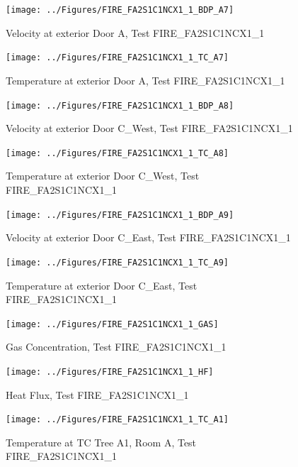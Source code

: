 \documentclass[11pt,oneside]{book}
\begin{document}
\begin{figure}[!ht]
\texttt{[image: ../Figures/FIRE\_FA2S1C1NCX1\_1\_BDP\_A7]}
\caption{Velocity at exterior Door A, Test FIRE\_FA2S1C1NCX1\_1}
\label{fig:FIRE_FA2S1C1NCX1_1_BDP_A7}
\end{figure}

\begin{figure}[!ht]
\texttt{[image: ../Figures/FIRE\_FA2S1C1NCX1\_1\_TC\_A7]}
\caption{Temperature at exterior Door A, Test FIRE\_FA2S1C1NCX1\_1}
\label{fig:FIRE_FA2S1C1NCX1_1_TC_A7}
\end{figure}

\begin{figure}[!ht]
\texttt{[image: ../Figures/FIRE\_FA2S1C1NCX1\_1\_BDP\_A8]}
\caption{Velocity at exterior Door C\_West, Test FIRE\_FA2S1C1NCX1\_1}
\label{fig:FIRE_FA2S1C1NCX1_1_BDP_A8}
\end{figure}

\begin{figure}[!ht]
\texttt{[image: ../Figures/FIRE\_FA2S1C1NCX1\_1\_TC\_A8]}
\caption{Temperature at exterior Door C\_West, Test FIRE\_FA2S1C1NCX1\_1}
\label{fig:FIRE_FA2S1C1NCX1_1_TC_A8}
\end{figure}

\begin{figure}[!ht]
\texttt{[image: ../Figures/FIRE\_FA2S1C1NCX1\_1\_BDP\_A9]}
\caption{Velocity at exterior Door C\_East, Test FIRE\_FA2S1C1NCX1\_1}
\label{fig:FIRE_FA2S1C1NCX1_1_BDP_A9}
\end{figure}

\begin{figure}[!ht]
\texttt{[image: ../Figures/FIRE\_FA2S1C1NCX1\_1\_TC\_A9]}
\caption{Temperature at exterior Door C\_East, Test FIRE\_FA2S1C1NCX1\_1}
\label{fig:FIRE_FA2S1C1NCX1_1_TC_A9}
\end{figure}

\begin{figure}[!ht]
\texttt{[image: ../Figures/FIRE\_FA2S1C1NCX1\_1\_GAS]}
\caption{Gas Concentration, Test FIRE\_FA2S1C1NCX1\_1}
\label{fig:FIRE_FA2S1C1NCX1_1_GAS}
\end{figure}

\begin{figure}[!ht]
\texttt{[image: ../Figures/FIRE\_FA2S1C1NCX1\_1\_HF]}
\caption{Heat Flux, Test FIRE\_FA2S1C1NCX1\_1}
\label{fig:FIRE_FA2S1C1NCX1_1_HF}
\end{figure}

\begin{figure}[!ht]
\texttt{[image: ../Figures/FIRE\_FA2S1C1NCX1\_1\_TC\_A1]}
\caption{Temperature at TC Tree A1, Room A, Test FIRE\_FA2S1C1NCX1\_1}
\label{fig:FIRE_FA2S1C1NCX1_1_TC_A1}
\end{figure}
\end{document}
